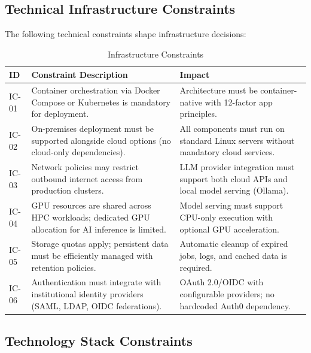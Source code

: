 \documentclass[a4paper,twoside]{sapthesis}
\begin{document}
\subsection{Technical Infrastructure Constraints}
\label{subsec:infrastructure-constraints}

The following technical constraints shape infrastructure decisions:

\begin{table}[htbp]
\centering
\caption{Infrastructure Constraints}
\label{tab:infrastructure-constraints}
\small
\begin{tabularx}{\textwidth}{p{0.8cm}Xp{4.5cm}}
\toprule
\textbf{ID} & \textbf{Constraint Description} & \textbf{Impact} \\
\midrule
IC-01 & Container orchestration via Docker Compose or Kubernetes is mandatory for deployment. & Architecture must be container-native with 12-factor app principles. \\
\midrule
IC-02 & On-premises deployment must be supported alongside cloud options (no cloud-only dependencies). & All components must run on standard Linux servers without mandatory cloud services. \\
\midrule
IC-03 & Network policies may restrict outbound internet access from production clusters. & LLM provider integration must support both cloud APIs and local model serving (Ollama). \\
\midrule
IC-04 & GPU resources are shared across HPC workloads; dedicated GPU allocation for AI inference is limited. & Model serving must support CPU-only execution with optional GPU acceleration. \\
\midrule
IC-05 & Storage quotas apply; persistent data must be efficiently managed with retention policies. & Automatic cleanup of expired jobs, logs, and cached data is required. \\
\midrule
IC-06 & Authentication must integrate with institutional identity providers (SAML, LDAP, OIDC federations). & OAuth 2.0/OIDC with configurable providers; no hardcoded Auth0 dependency. \\
\bottomrule
\end{tabularx}
\end{table}

\subsection{Technology Stack Constraints}
\label{subsec:technology-constraints}
\end{document}
